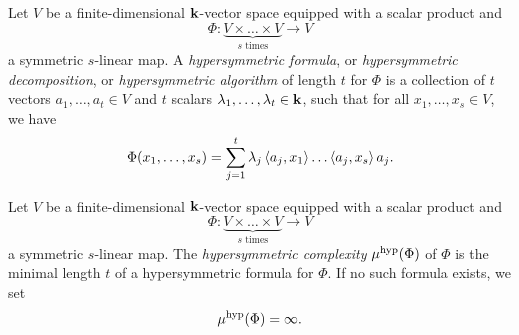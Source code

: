 \begin{defi}
Let $V$ be a finite-dimensional $\mathbf{k}$-vector
space equipped with a scalar product and
\[
  \Phi:\underset{\textrm{$s$ times}}{\underbrace{V\times\dots\times V}}\to V
\]
a symmetric $s$-linear map. A \emph{hypersymmetric formula}, or
\emph{hypersymmetric decomposition}, or \emph{hypersymmetric algorithm} of length $t$ for $\Phi$ is a
collection of $t$ vectors $a_1, \dots, a_t\in V$ and $t$ scalars $\lambda_1,
\dots, \lambda_t\in\mathbf{k}$, such that for all $x_1, \dots, x_s\in
V$, we have
\[
  \Phi(x_1, \dots, x_s) =
  \sum_{j=1}^t\lambda_j\left\langle a_j,x_1\right\rangle\dots\left\langle a_j,x_s\right\rangle a_j.
\]
\end{defi}
\begin{defi}
Let $V$ be a finite-dimensional $\mathbf{k}$-vector space equipped with a scalar product
and
\[
  \Phi:\underset{\textrm{$s$ times}}{\underbrace{V\times\dots\times V}}\to V
\]
a symmetric $s$-linear map. The \emph{hypersymmetric complexity} $\mu^{\textrm{hyp}}(\Phi)$ of $\Phi$ is the
minimal length $t$ of a hypersymmetric formula for $\Phi$. If no such
formula exists, we set
\[
  \mu^{\textrm{hyp}}(\Phi) = \infty.
\]
\end{defi}

